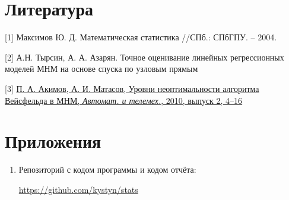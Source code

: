\section{Литература}
[1] Максимов Ю. Д. Математическая статистика //СПб.: СПбГПУ. – 2004. \label{tyrsin}

[2] А.Н. Тырсин, А. А. Азарян. Точное оценивание линейных регрессионных моделей МНМ на основе спуска по узловым прямым

[3] \label{weysfeld} \href{http://www.mathnet.ru/links/ce163a853ad298d45239f7831dac2992/at773.pdf}{П. А. Акимов, А. И. Матасов, Уровни неоптимальности алгоритма Вейсфельда в МНМ, \textit{Автомат. и телемех.}, 2010, выпуск 2, 4--16}

\section{Приложения}

\begin{enumerate}
	\item Репозиторий с кодом программы и кодом отчёта:
	
	\href{https://github.com/kystyn/stats}{https://github.com/kystyn/stats}
\end{enumerate}